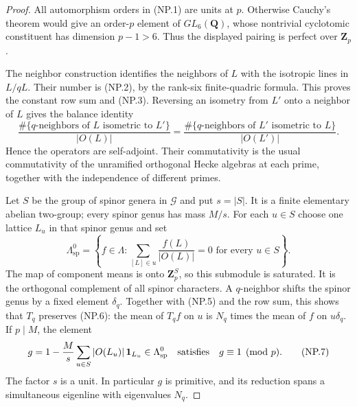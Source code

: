 \documentclass[11pt,a4paper]{article}
\theoremstyle{definition}
\begin{document}
\begin{proof}
All automorphism orders in (NP.1) are units at $p$.  Otherwise Cauchy's
theorem would give an order-$p$ element of $GL_6(\mathbf Q)$, whose
nontrivial cyclotomic constituent has dimension $p-1>6$.
Thus the displayed pairing is perfect over $\mathbf Z_p$.

The neighbor construction identifies the neighbors of $L$ with the
isotropic lines in $L/qL$.  Their number is (NP.2), by the rank-six
finite-quadric formula.  This proves the constant row sum and (NP.3).
Reversing an isometry from $L'$ onto a neighbor of $L$ gives the balance
identity
\[
 \frac{\#\{q\text{-neighbors of }L\text{ isometric to }L'\}}{|O(L)|}
 =\frac{\#\{q\text{-neighbors of }L'\text{ isometric to }L\}}{|O(L')|}.
 \tag{NP.5}
\]
Hence the operators are self-adjoint.  Their commutativity is the usual
commutativity of the unramified orthogonal Hecke algebras at each prime,
together with the independence of different primes.

Let $S$ be the group of spinor genera in $\mathcal G$ and put $s=|S|$.
It is a finite elementary abelian two-group; every spinor genus has
mass $M/s$.  For each $u\in S$ choose one lattice $L_u$ in that spinor
genus and set
\[
 \Lambda^0_{\mathrm{sp}}
  =\left\{f\in\Lambda:\sum_{[L]\in u}\frac{f(L)}{|O(L)|}=0
                       \text{ for every }u\in S\right\}.
 \tag{NP.6}
\]
The map of component means is onto $\mathbf Z_p^S$, so this submodule
is saturated.  It is the orthogonal complement of all spinor characters.
A $q$-neighbor shifts the spinor genus by a fixed element $\delta_q$.
Together with (NP.5) and the row sum, this shows that $T_q$ preserves
(NP.6): the mean of $T_qf$ on $u$ is $N_q$ times the mean of $f$ on
$u\delta_q$.  If $p\mid M$, the element
\[
 g=1-\frac Ms\sum_{u\in S}|O(L_u)|\,\mathbf1_{L_u}
       \in\Lambda^0_{\mathrm{sp}}
       \quad\hbox{satisfies}\quad g\equiv1\pmod p.
 \tag{NP.7}
\]
The factor $s$ is a unit.  In particular $g$ is primitive, and its
reduction spans a simultaneous eigenline with eigenvalues $N_q$.


\end{proof}
\end{document}
